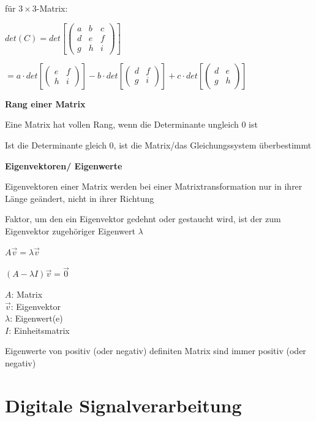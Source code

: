 für $3 \times 3$-Matrix:

$\displaystyle{
    det(C) = det\left[
        \begin{pmatrix}
            a & b & c\\
            d & e & f\\
            g & h & i
        \end{pmatrix}
    \right]
}$

$\displaystyle{
    = a \cdot det\left[ \begin{pmatrix}
        e & f\\
        h & i
        \end{pmatrix} \right]
    - b \cdot det\left[ \begin{pmatrix}
        d & f\\
        g & i
        \end{pmatrix} \right]
    + c \cdot det\left[ \begin{pmatrix}
        d & e\\
        g & h
        \end{pmatrix} \right]
}$

\textbf{Rang einer Matrix}

Eine Matrix hat vollen Rang, wenn die Determinante ungleich 0 ist

Ist die Determinante gleich 0, ist die Matrix/das Gleichungssystem überbestimmt

\textbf{Eigenvektoren/ Eigenwerte}

Eigenvektoren einer Matrix werden bei einer Matrixtransformation nur in ihrer Länge geändert,
nicht in ihrer Richtung

Faktor, um den ein Eigenvektor gedehnt oder gestaucht wird, ist der zum Eigenvektor zugehöriger
Eigenwert $\lambda$

$\displaystyle{
    A \vec{v} = \lambda \vec{v}
}$

$\displaystyle{
    (A - \lambda I) \vec{v} = \vec{0}
}$

$A$: Matrix\\
$\vec{v}$: Eigenvektor\\
$\lambda$: Eigenwert(e)\\
$I$: Einheitsmatrix

Eigenwerte von positiv (oder negativ) definiten Matrix sind immer positiv (oder negativ)


\section{Digitale Signalverarbeitung}

